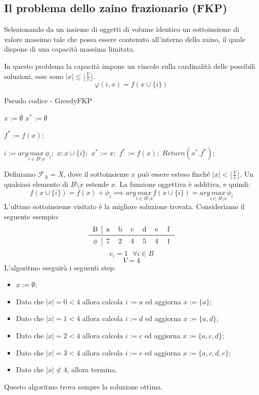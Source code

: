 \documentclass{article}
\begin{document}
    \subsection{Il problema dello zaino frazionario (FKP)}
    Selezionando da un insieme di oggetti di volume identico un sottoinsieme di
    valore massimo tale che possa essere contenuto all'interno dello zaino, il quale dispone di una
    capacità massima limitata.

    In questo problema la capacità impone un vincolo sulla cardinalità delle possibili soluzioni,
    esse sono $|x|\leq\lfloor \frac{V}{v}\rfloor$.
    $$\varphi(i,x)=f(x\cup\{i\})$$
    \begin{algorithm}[H]
        \caption{Pseudo codice - GreedyFKP}
        \begin{algorithmic}
            \State $x:=\emptyset$
            \State $x^*:=\emptyset$

            \State $f^*:=f(x);$
            \Else
            \EndIf

            \State $i:=arg\underset{i\in B\setminus x}{max}\phi_i;$
            \State $x:x\cup\{i\};$
            \State $x^* := x;$
            \State $f^* := f(x);$
            \EndIf
            \EndWhile
            \State $Return(x^*.f^*);$
        \end{algorithmic}
    \end{algorithm}
    Definiamo $\mathcal{F}_A = X$, dove il sottoinsieme $x$ può essere esteso finché $|x|<\lfloor\frac{V}{v}\rfloor$.
    Un qualsiasi elemento di $B\setminus x$ estende $x$. La funzione oggettiva è additiva, e quindi:
    $$f(x\cup\{i\})=f(x)+\phi_i\implies arg\underset{i\in B\setminus x }{max} f(x\cup\{i\}) = arg\underset{i\in B\setminus x }{max}\phi_i$$
    L'ultimo sottoinsieme visitato è la migliore soluzione trovata.
    Consideriamo il seguente esempio:
    \[
        \begin{tabular}{c | c c c c c c c}
            B      & a & b & c & d & e & f \\
            \midrule
            $\phi$ & 7 & 2 & 4 & 5 & 4 & 1 \\
        \end{tabular}
    \]
    $$v_i=1\text{ }\forall i\in B$$
    $$V=4$$
    L'algoritmo eseguirà i seguenti step:
    \begin{itemize}
        \item $x:=\emptyset;$
        \item Dato che $|x|=0<4$ allora calcola $i:=a$ ed aggiorna $x:=\{a\};$
        \item Dato che $|x|=1<4$ allora calcola $i:=d$ ed aggiorna $x:=\{a,d\};$
        \item Dato che $|x|=2<4$ allora calcola $i:=c$ ed aggiorna $x:=\{a,c,d\};$
        \item Dato che $|x|=3<4$ allora calcola $i:=e$ ed aggiorna $x:=\{a,c,d,e\};$
        \item Dato che $|x|\nless 4$, allora termina.
    \end{itemize}
    Questo algoritmo trova sempre la soluzione ottima.
\end{document}
